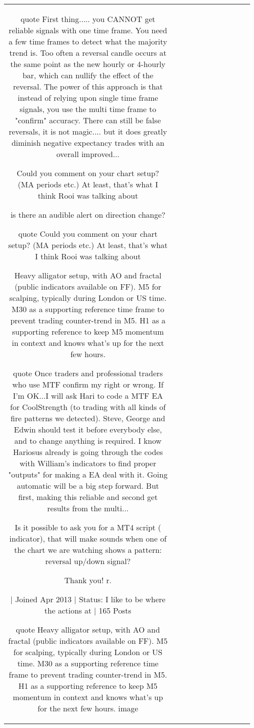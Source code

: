 \begin{table}[h!]
\begin{tabular}{|c|c|c|c|c|c|c|c|c|c|c|}
{quote} First thing..... you CANNOT get reliable signals with one time frame. You need a few time frames to detect what the majority trend is. Too often a reversal candle occurs at the same point as the new hourly or 4-hourly bar, which can nullify the effect of the reversal. The power of this approach is that instead of relying upon single time frame signals, you use the multi time frame to "confirm" accuracy. There can still be false reversals, it is not magic.... but it does greatly diminish negative expectancy trades with an overall improved...

Could you comment on your chart setup? (MA periods etc.) At least, that's what I think Rooi was talking about 

is there an audible alert on direction change?

{quote} Could you comment on your chart setup? (MA periods etc.) At least, that's what I think Rooi was talking about 

Heavy alligator setup, with AO and fractal (public indicators available on FF).
M5 for scalping, typically during London or US time.
M30 as a supporting reference time frame to prevent trading counter-trend in M5.
H1 as a supporting reference to keep M5 momentum in context and knows what's up for the next few hours.

{quote} Once traders and professional traders who use MTF confirm my right or wrong. If I'm OK...I will ask Hari to code a MTF EA for CoolStrength (to trading with all kinds of fire patterns we detected). Steve, George and Edwin should test it before everybody else, and to change anything is required. I know Hariosus already is going through the codes with William's indicators to find proper "outputs" for making a EA deal with it. Going automatic will be a big step forward. But first, making this reliable and second get results from the multi...

Is it possible to ask you for a MT4 script ( indicator), that will make sounds when one of the chart we are watching shows a pattern: reversal up/down signal?

Thank you!
r.

| Joined Apr 2013 | Status: I like to be where the actions at | 165 Posts 

{quote} Heavy alligator setup, with AO and fractal (public indicators available on FF). M5 for scalping, typically during London or US time. M30 as a supporting reference time frame to prevent trading counter-trend in M5. H1 as a supporting reference to keep M5 momentum in context and knows what's up for the next few hours. {image}


\end{tabular}
\end{table}
